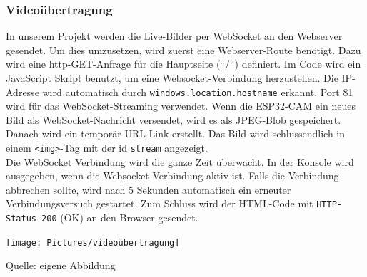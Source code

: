 \documentclass[ngerman,12pt,a4paper]{article}
\begin{document}
			\subsubsection{Videoübertragung}
			In unserem Projekt werden die Live-Bilder per WebSocket an den Webserver gesendet. Um dies umzusetzen, wird zuerst eine Webserver-Route benötigt. Dazu wird eine http-GET-Anfrage für die Hauptseite (“/“) definiert. Im Code wird ein JavaScript Skript benutzt, um eine Websocket-Verbindung herzustellen. Die IP-Adresse wird automatisch durch \texttt{windows.location.hostname} erkannt. Port 81 wird für das WebSocket-Streaming verwendet. Wenn die ESP32-CAM ein neues Bild als WebSocket-Nachricht versendet, wird es als JPEG-Blob gespeichert. Danach wird ein temporär URL-Link erstellt. Das Bild wird schlussendlich in einem \texttt{<img>}-Tag mit der id \texttt{stream} angezeigt. \\
			Die WebSocket Verbindung wird die ganze Zeit überwacht. In der Konsole wird ausgegeben, wenn die Websocket-Verbindung aktiv ist. Falls die Verbindung abbrechen sollte, wird nach 5 Sekunden automatisch ein erneuter Verbindungsversuch gestartet. Zum Schluss wird der HTML-Code mit \texttt{HTTP-Status 200} (OK) an den Browser gesendet.
			\begin{center}
				\begin{minipage}[t]{0.75\textwidth}
					\texttt{[image: Pictures/videoübertragung]}
					\label{fig:Videoübertragung}
					\vspace{-10pt}
					\begin{center}
						\par\small Quelle: eigene Abbildung 
					\end{center}
				\end{minipage}
			\end{center}
			
			
			
\end{document}
